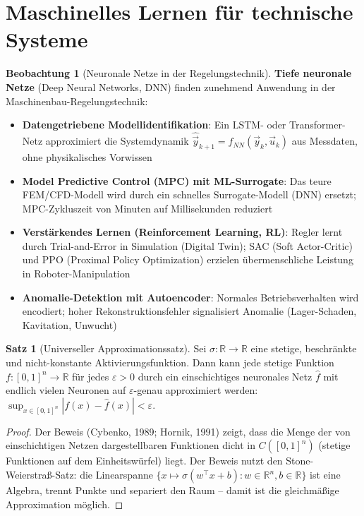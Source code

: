 ﻿\documentclass[a4paper,12pt]{report}
\theoremstyle{definition}
\newtheorem{satz}{Satz}
\newtheorem{beobachtung}{Beobachtung}
\begin{document}
\section{Maschinelles Lernen für technische Systeme}

\begin{beobachtung}[Neuronale Netze in der Regelungstechnik]
\textbf{Tiefe neuronale Netze} (Deep Neural Networks, DNN) finden
zunehmend Anwendung in der Maschinenbau-Regelungstechnik:
\begin{itemize}
    \item[-] \textbf{Datengetriebene Modellidentifikation}: Ein LSTM- oder
          Transformer-Netz approximiert die Systemdynamik $\hat{\vec{y}}_{k+1} = f_{NN}(\vec{y}_k, \vec{u}_k)$
          aus Messdaten, ohne physikalisches Vorwissen
    \item[-] \textbf{Model Predictive Control (MPC) mit ML-Surrogate}:
          Das teure FEM/CFD-Modell wird durch ein schnelles Surrogate-Modell (DNN)
          ersetzt; MPC-Zykluszeit von Minuten auf Millisekunden reduziert
    \item[-] \textbf{Verstärkendes Lernen (Reinforcement Learning, RL)}:
          Regler lernt durch Trial-and-Error in Simulation (Digital Twin);
          SAC (Soft Actor-Critic) und PPO (Proximal Policy Optimization)
          erzielen übermenschliche Leistung in Roboter-Manipulation
    \item[-] \textbf{Anomalie-Detektion mit Autoencoder}:
          Normales Betriebsverhalten wird encodiert; hoher Rekonstruktionsfehler
          signalisiert Anomalie (Lager-Schaden, Kavitation, Unwucht)
\end{itemize}
\end{beobachtung}

\begin{satz}[Universeller Approximationssatz]
Sei $\sigma: \mathbb{R} \to \mathbb{R}$ eine stetige, beschränkte und
nicht-konstante Aktivierungsfunktion. Dann kann jede stetige Funktion
$f: [0,1]^n \to \mathbb{R}$ für jedes $\varepsilon > 0$ durch ein
einschichtiges neuronales Netz $\hat{f}$ mit endlich vielen Neuronen
auf $\varepsilon$-genau approximiert werden:
$\sup_{x\in[0,1]^n}|f(x) - \hat{f}(x)| < \varepsilon$.
\end{satz}
\begin{proof}
Der Beweis (Cybenko, 1989; Hornik, 1991) zeigt, dass die Menge der
von einschichtigen Netzen dargestellbaren Funktionen dicht in
$C([0,1]^n)$ (stetige Funktionen auf dem Einheitswürfel) liegt.
Der Beweis nutzt den Stone-Weierstraß-Satz: die Linearspanne
$\{x\mapsto\sigma(w^\top x + b) : w\in\mathbb{R}^n, b\in\mathbb{R}\}$
ist eine Algebra, trennt Punkte und separiert den Raum -- damit
ist die gleichmäßige Approximation möglich.
\end{proof}
\end{document}
